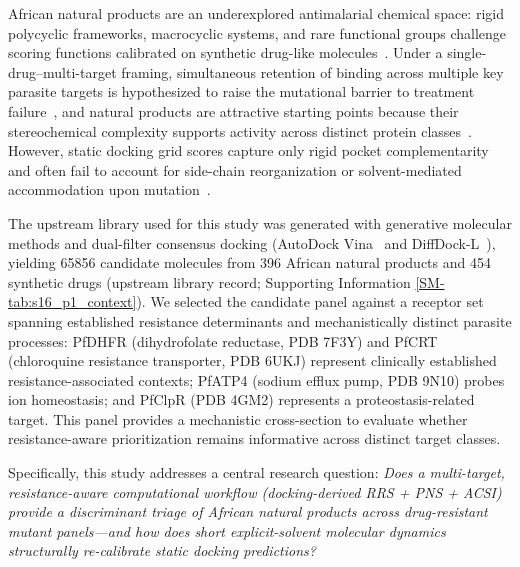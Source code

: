 \documentclass[journal=jcisd8,manuscript=article,layout=traditional]{achemso}
\begin{document}
African natural products are an underexplored antimalarial chemical space: rigid polycyclic frameworks, macrocyclic systems, and rare functional groups challenge scoring functions calibrated on synthetic drug-like molecules~\citep{ferreira2023docking}. Under a single-drug--multi-target framing, simultaneous retention of binding across multiple key parasite targets is hypothesized to raise the mutational barrier to treatment failure~\citep{polypharmacology_malaria_2026}, and natural products are attractive starting points because their stereochemical complexity supports activity across distinct protein classes~\citep{polypharmacology_malaria_2026,value_addition_african_np_2025}. However, static docking grid scores capture only rigid pocket complementarity and often fail to account for side-chain reorganization or solvent-mediated accommodation upon mutation~\citep{ferreira2023docking,soares2023mdreport}.

The upstream library used for this study was generated with generative molecular methods and dual-filter consensus docking (AutoDock Vina~\citep{vina_2021} and DiffDock-L~\citep{diffdock_2023}), yielding \num{65856} candidate molecules from 396 African natural products and 454 synthetic drugs (upstream library record; Supporting Information \cref{SM-tab:s16_p1_context}). We selected the candidate panel against a receptor set spanning established resistance determinants and mechanistically distinct parasite processes: PfDHFR (dihydrofolate reductase, PDB 7F3Y) and PfCRT (chloroquine resistance transporter, PDB 6UKJ) represent clinically established resistance-associated contexts; PfATP4 (sodium efflux pump, PDB 9N10) probes ion homeostasis; and PfClpR (PDB 4GM2) represents a proteostasis-related target. This panel provides a mechanistic cross-section to evaluate whether resistance-aware prioritization remains informative across distinct target classes.

Specifically, this study addresses a central research question: \textit{Does a multi-target, resistance-aware computational workflow (docking-derived RRS + PNS + ACSI) provide a discriminant triage of African natural products across drug-resistant mutant panels---and how does short explicit-solvent molecular dynamics structurally re-calibrate static docking predictions?}
\end{document}
